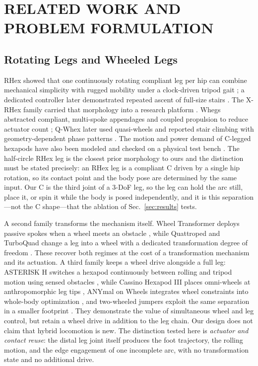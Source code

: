 \section{RELATED WORK AND PROBLEM FORMULATION}

\subsection{Rotating Legs and Wheeled Legs}

RHex showed that one continuously rotating compliant leg per hip can combine
mechanical simplicity with rugged mobility under a clock-driven tripod gait
\cite{saranli2001rhex,altendorfer2001rhex}; a dedicated controller later
demonstrated repeated ascent of full-size stairs \cite{moore2002reliable}.
The X-RHex family carried that morphology into a research platform
\cite{galloway2010xrhex}. Whegs abstracted
compliant, multi-spoke appendages and coupled propulsion to reduce actuator
count \cite{quinn2002whegs}; Q-Whex later used quasi-wheels and reported stair
climbing with geometry-dependent phase patterns \cite{zhang2023qwhex}. The
motion and power demand of C-legged hexapods have also been modeled and checked
on a physical test bench \cite{vina2021cleg}. The
half-circle RHex leg is the closest prior morphology to ours and the distinction
must be stated precisely: an RHex leg is a compliant C driven by a single hip
rotation, so its contact point and the body pose are determined by the same
input. Our C is the third joint of a 3-DoF leg, so the leg can hold the arc
still, place it, or spin it while the body is posed independently, and it is
this separation---not the C shape---that the ablation of Sec.~\ref{sec:results}
tests.

A second family transforms the mechanism itself. Wheel Transformer deploys
passive spokes when a wheel meets an obstacle \cite{kim2014wheeltransformer},
while Quattroped and TurboQuad change a leg into a wheel with a dedicated
transformation degree of freedom \cite{chen2014quattroped,chen2017turboquad}.
These recover both regimes at the cost of a transformation mechanism and its
actuation. A third family keeps a wheel drive alongside a full leg: ASTERISK H
switches a hexapod continuously between rolling and tripod motion using sensed
obstacles \cite{yoshioka2008asterisk}, while Cassino Hexapod III places
omni-wheels at anthropomorphic leg tips
\cite{tedeschi2017cassino}, ANYmal on Wheels integrates wheel constraints into
whole-body optimization \cite{bjelonic2019keep,bjelonic2021wholebody,hutter2016anymal},
and two-wheeled jumpers exploit the same separation in a smaller footprint
\cite{klemm2019ascento}. They demonstrate the value of simultaneous wheel and leg
control, but retain a wheel drive in addition to the leg chain. Our design does
not claim that hybrid locomotion is new. The distinction tested here is
\emph{actuator and contact reuse}: the distal leg joint itself produces the foot
trajectory, the rolling motion, and the edge engagement of one incomplete arc,
with no transformation state and no additional drive.

